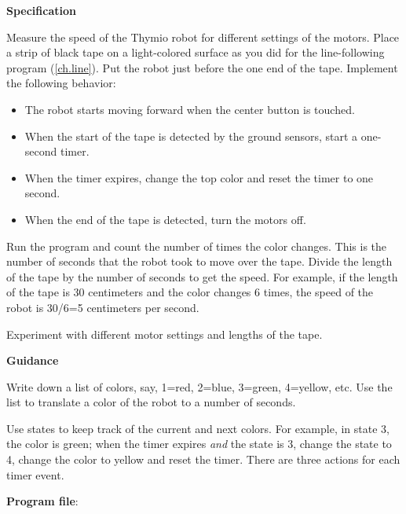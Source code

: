 
\label{ch.speed}

\textbf{Specification}

Measure the speed of the Thymio robot for different settings of the
motors. Place a strip of black tape on a light-colored surface as you
did for the line-following program (\cref{ch.line}). Put the robot just
before the one end of the tape. Implement the following behavior:

\begin{itemize}

\item The robot starts moving forward when the center button is touched.

\item When the start of the tape is detected by the ground sensors,
start a one-second timer.

\item When the timer expires, change the top color and reset the timer
to one second.

\item When the end of the tape is detected, turn the motors off.

\end{itemize} 

Run the program and count the number of times the color changes. This is
the number of seconds that the robot took to move over the tape. Divide
the length of the tape by the number of seconds to get the speed. For
example, if the length of the tape is 30 centimeters and the color
changes 6 times, the speed of the robot is 30/6=5 centimeters per
second.

Experiment with different motor settings and lengths of the tape.

\textbf{Guidance}

Write down a list of colors, say, 1=red, 2=blue, 3=green, 4=yellow, etc.
Use the list to translate a color of the robot to a number of seconds.

Use states to keep track of the current and next colors. For example, in
state 3, the color is green; when the timer expires \emph{and} the state
is 3, change the state to 4, change the color to yellow and reset the
timer. There are three actions for each timer event.

\bigskip

{\raggedleft \hfill \textbf{Program file}: }
